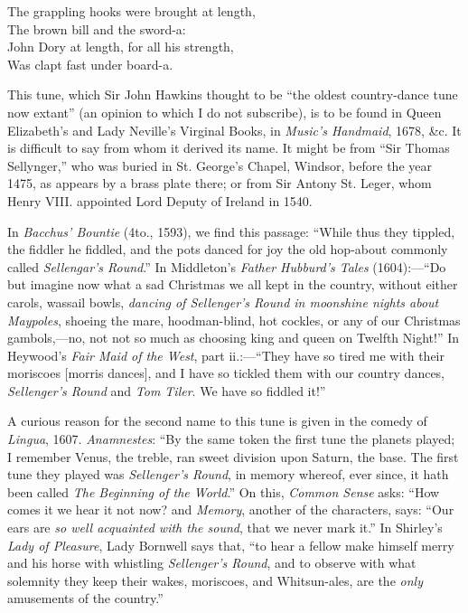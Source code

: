 \begin{dcverse}
\begin{altverse}
The grappling hooks were brought at length,\\
The brown bill and the sword-a:\\
John Dory at length, for all his strength,\\
Was clapt fast under board-a.
\end{altverse}
\end{dcverse}\normalsize

\pagebreak


\bigskip



\pagebreak

This tune, which Sir John Hawkins thought to be “the oldest country-dance
tune now extant” (an opinion to which I do not subscribe), is to be found in
Queen Elizabeth’s and Lady Neville’s Virginal Books, in \textit{Music’s Handmaid},
1678, \&c. It is difficult to say from whom it derived its name. It might be from
“Sir Thomas Sellynger,” who was buried in St. George’s Chapel, Windsor,
before the year 1475, as appears by a brass plate there; or from Sir Antony
St. Leger, whom Henry VIII. appointed Lord Deputy of Ireland in 1540.

In \textit{Bacchus' Bountie} (4to., 1593), we find this passage: “While thus they
tippled, the fiddler he fiddled, and the pots danced for joy the old hop-about
commonly called \textit{Sellengar’s Round}.” In Middleton’s \textit{Father Hubburd’s Tales}
(1604):—“Do but imagine now what a sad Christmas we all kept in the country,
without either carols, wassail bowls, \textit{dancing of Sellenger's Round in moonshine
nights about Maypoles}, shoeing the mare, hoodman-blind, hot cockles, or any of our
Christmas gambols,—no, not not so much as choosing king and queen on Twelfth
Night!” In Heywood’s \textit{Fair Maid of the West}, part ii.:—“They have so tired
me with their moriscoes [morris dances], and I have so tickled them with our
country dances, \textit{Sellenger’s Round} and \textit{Tom Tiler}. We have so fiddled it!”

A curious reason for the second name to this tune is given in the comedy
of \textit{Lingua}, 1607. \textit{Anamnestes}: “By the same token the first tune the planets
played; I remember Venus, the treble, ran sweet division upon Saturn, the base.
The first tune they played was \textit{Sellenger’s Round}, in memory whereof, ever since,
it hath been called \textit{The Beginning of the World}.” On this, \textit{Common Sense} asks:
“How comes it we hear it not now? and \textit{Memory}, another of the characters,
says: “Our ears are \textit{so well acquainted with the sound}, that we never mark it.”
In Shirley’s \textit{Lady of Pleasure}, Lady Bornwell says that, “to hear a fellow make
himself merry and his horse with whistling \textit{Sellenger’s Round}, and to observe with
what solemnity they keep their wakes, moriscoes, and Whitsun-ales, are the \textit{only}
amusements of the country.”

